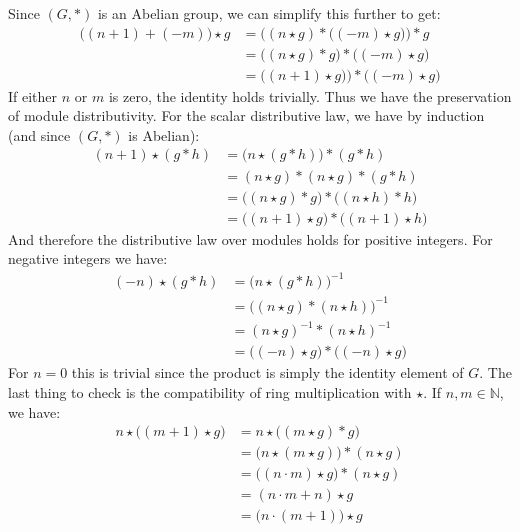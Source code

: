     Since $(G,*)$ is an Abelian group, we can simplify this further to get:
    \begin{subequations}
        \begin{align}
            \big((n+1)+(\minus{m})\big)\star{g}
            &=\Big((n\star{g})*\big((\minus{m})\star{g}\big)\Big)*g\\
            &=\Big((n\star{g})*g\Big)*\big((\minus{m})\star{g}\big)\\
            &=\Big((n+1)\star{g})\Big)*\big((\minus{m})\star{g}\big)
        \end{align}
    \end{subequations}
    If either $n$ or $m$ is zero, the identity holds trivially. Thus we have the
    preservation of module distributivity. For the scalar distributive law, we
    have by induction (and since $(G,*)$ is Abelian):
    \begin{subequations}
        \begin{align}
            (n+1)\star(g*h)
            &=\big(n\star(g*h)\big)*(g*h)\\
            &=(n\star{g})*(n\star{g})*(g*h)\\
            &=\big((n\star{g})*g\big)*\big((n\star{h})*h\big)\\
            &=\big((n+1)\star{g}\big)*\big((n+1)\star{h}\big)
        \end{align}
    \end{subequations}
    And therefore the distributive law over modules holds for positive integers.
    For negative integers we have:
    \begin{subequations}
        \begin{align}
            (\minus{n})\star(g*h)
            &=\big(n\star(g*h)\big)^{\minus{1}}\\
            &=\big((n\star{g})*(n\star{h})\big)^{\minus{1}}\\
            &=(n\star{g})^{\minus{1}}*(n\star{h})^{\minus{1}}\\
            &=\big((\minus{n})\star{g}\big)*\big((\minus{n})\star{g}\big)
        \end{align}
    \end{subequations}
    For $n=0$ this is trivial since the product is simply the identity element
    of $G$. The last thing to check is the compatibility of ring multiplication
    with $\star$. If $n,m\in\mathbb{N}$, we have:
    \begin{subequations}
        \begin{align}
            n\star\big((m+1)\star{g}\big)
            &=n\star\big((m\star{g})*g\big)\\
            &=\big(n\star(m\star{g})\big)*(n\star{g})\\
            &=\big((n\cdot{m})\star{g}\big)*(n\star{g})\\
            &=(n\cdot{m}+n)\star{g}\\
            &=\big(n\cdot(m+1)\big)\star{g}
        \end{align}
    \end{subequations}
